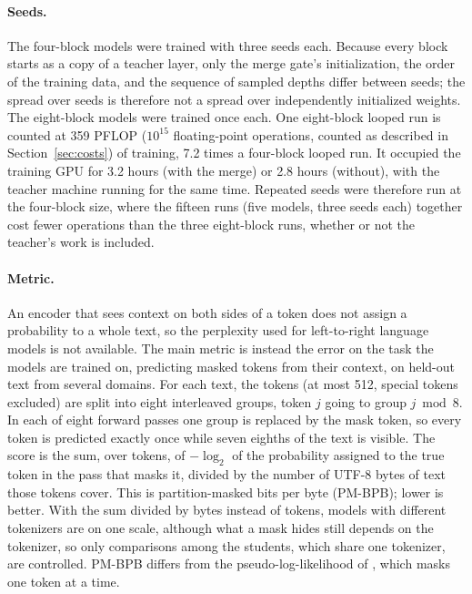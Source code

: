 \documentclass[11pt]{article}
\begin{document}
\paragraph{Seeds.}
The four-block models were trained with three seeds each. Because every block starts as a copy of a teacher layer, only the merge gate's
initialization, the order of the training data, and the sequence of sampled depths differ between seeds; the spread over seeds is therefore not a spread over
independently initialized weights. The eight-block models were trained once each. One eight-block looped run is counted at 359 PFLOP ($10^{15}$ floating-point
operations, counted as described in Section~\ref{sec:costs}) of training, 7.2 times a four-block looped run. It occupied the training GPU for
3.2 hours (with the merge) or 2.8 hours (without), with the teacher machine running for the same time. Repeated seeds were therefore run at the
four-block size, where the fifteen runs (five models, three seeds each) together cost fewer operations than the three eight-block runs, whether or
not the teacher's work is included.

\paragraph{Metric.}
\label{sec:metric}
An encoder that sees context on both sides of a token does not assign a probability to a whole text, so the perplexity used for left-to-right
language models is not available. The main metric is instead the error on the task the models are trained on, predicting masked tokens from
their context, on held-out text from several domains. For each text, the tokens (at most 512, special tokens excluded) are split into eight
interleaved groups, token $j$ going to group $j \bmod 8$. In each of eight forward passes one group is replaced by the mask token, so every
token is predicted exactly once while seven eighths of the text is visible. The score is the sum, over tokens, of $-\log_2$ of the probability assigned
to the true token in the pass that masks it, divided by the number of UTF-8 bytes of text those tokens cover. This is partition-masked bits
per byte (PM-BPB); lower is better. With the sum divided by bytes instead of tokens, models with different tokenizers are on one scale, although what a mask
hides still depends on the tokenizer, so only comparisons among the students, which share one tokenizer, are controlled. PM-BPB differs from the
pseudo-log-likelihood of \citet{salazar2020mlmscoring}, which masks one token at a time.
\end{document}
